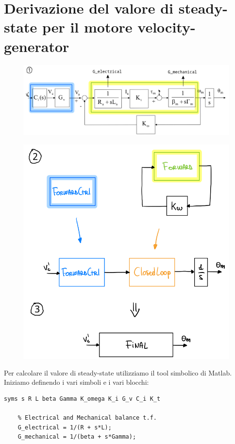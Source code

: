\section{Derivazione del valore di steady-state per il motore velocity-generator}\label{appendix:torque_controlled_steady_state_derivation}


\begin{figure}[H]
	\centering
	\includegraphics[width=0.7\linewidth]{images/appendix_steady_state_1}
	\label{fig:appendixsteadystate1}
\end{figure}

\begin{figure}[H]
	\centering
	\includegraphics[width=0.6\linewidth]{images/appendix_steady_state_2}
	\label{fig:appendixsteadystate2}
\end{figure}

Per calcolare il valore di steady-state utilizziamo il tool simbolico di Matlab.\\

 Iniziamo definendo i vari simboli e i vari blocchi:

\begin{lstlisting}[frame=single,style=Matlab-editor]
	syms s R L beta Gamma K_omega K_i G_v C_i K_t
	
	% Electrical and Mechanical balance t.f.
	G_electrical = 1/(R + s*L);
	G_mechanical = 1/(beta + s*Gamma);
\end{lstlisting}

